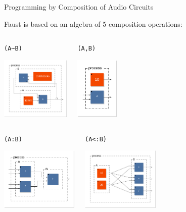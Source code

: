 
\begin{frame}[fragile]{Programming by Composition of Audio Circuits}

Faust is based on an algebra of 5 composition operations:
		
\begin{columns}
\begin{center}
\lstinline'(A~B)'

\includegraphics[height=3cm]{images/rec1} 
\end{center}

\begin{center}
\lstinline'(A,B)'

\includegraphics[height=3cm]{images/par1}
\end{center}

\end{columns}

\begin{columns}
\begin{center}
\lstinline'(A:B)'

\includegraphics[height=3cm]{images/seq1} 
\end{center}

\begin{center}
\lstinline'(A<:B)'

\includegraphics[height=3cm]{images/split1}
\end{center}


\end{columns}
\end{frame}
